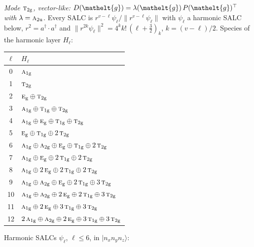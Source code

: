 \documentclass[11pt]{article}
\newcommand{\eltfont}[1]{{\let\sigma\eltsigma\mathelt{#1}}}
\newcommand{\irr}[1]{\text{\normalfont\scshape #1}}
\newcommand{\elt}[1]{\eltfont{#1}}
\newcommand{\ptag}[1]{\mathrm{#1}}
\newcommand{\occ}[1]{\lvert #1\rangle}
\newcommand{\gel}{\elt{g}}             %
\newcommand{\gmat}{P(\gel)^{\top}}     %
\begin{document}
\emph{Mode $\irr{t}_{2\ptag{g}}$, vector-like: $D(\gel)=\lambda(\gel)\,\gmat$ with $\lambda=\irr{a}_{2\ptag{u}}$.} Every SALC is $r^{v-\ell}\psi_\ell/\lVert r^{v-\ell}\psi_\ell\rVert$ with $\psi_\ell$ a harmonic SALC below, $r^2=a^\dagger\!\cdot a^\dagger$ and $\lVert r^{2k}\psi_\ell\rVert^2=4^kk!\,(\ell+\tfrac32)_k$, $k=(v-\ell)/2$. Species of the harmonic layer $H_\ell$:
\begin{longtable}{c l}\hline $\ell$ & $H_\ell$\\ \hline\endhead
0 & $\irr{a}_{1\ptag{g}}$\\
1 & $\irr{t}_{2\ptag{g}}$\\
2 & $\irr{e}_{\ptag{g}}\oplus \irr{t}_{2\ptag{g}}$\\
3 & $\irr{a}_{1\ptag{g}}\oplus \irr{t}_{1\ptag{g}}\oplus \irr{t}_{2\ptag{g}}$\\
4 & $\irr{a}_{1\ptag{g}}\oplus \irr{e}_{\ptag{g}}\oplus \irr{t}_{1\ptag{g}}\oplus \irr{t}_{2\ptag{g}}$\\
5 & $\irr{e}_{\ptag{g}}\oplus \irr{t}_{1\ptag{g}}\oplus 2\,\irr{t}_{2\ptag{g}}$\\
6 & $\irr{a}_{1\ptag{g}}\oplus \irr{a}_{2\ptag{g}}\oplus \irr{e}_{\ptag{g}}\oplus \irr{t}_{1\ptag{g}}\oplus 2\,\irr{t}_{2\ptag{g}}$\\
7 & $\irr{a}_{1\ptag{g}}\oplus \irr{e}_{\ptag{g}}\oplus 2\,\irr{t}_{1\ptag{g}}\oplus 2\,\irr{t}_{2\ptag{g}}$\\
8 & $\irr{a}_{1\ptag{g}}\oplus 2\,\irr{e}_{\ptag{g}}\oplus 2\,\irr{t}_{1\ptag{g}}\oplus 2\,\irr{t}_{2\ptag{g}}$\\
9 & $\irr{a}_{1\ptag{g}}\oplus \irr{a}_{2\ptag{g}}\oplus \irr{e}_{\ptag{g}}\oplus 2\,\irr{t}_{1\ptag{g}}\oplus 3\,\irr{t}_{2\ptag{g}}$\\
10 & $\irr{a}_{1\ptag{g}}\oplus \irr{a}_{2\ptag{g}}\oplus 2\,\irr{e}_{\ptag{g}}\oplus 2\,\irr{t}_{1\ptag{g}}\oplus 3\,\irr{t}_{2\ptag{g}}$\\
11 & $\irr{a}_{1\ptag{g}}\oplus 2\,\irr{e}_{\ptag{g}}\oplus 3\,\irr{t}_{1\ptag{g}}\oplus 3\,\irr{t}_{2\ptag{g}}$\\
12 & $2\,\irr{a}_{1\ptag{g}}\oplus \irr{a}_{2\ptag{g}}\oplus 2\,\irr{e}_{\ptag{g}}\oplus 3\,\irr{t}_{1\ptag{g}}\oplus 3\,\irr{t}_{2\ptag{g}}$\\
\hline\end{longtable}
Harmonic SALCs $\psi_\ell$, $\ell\le6$, in $\occ{n_xn_yn_z}$:
\end{document}
